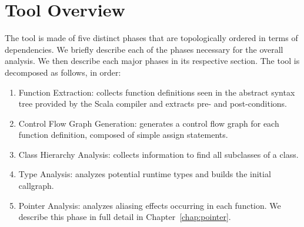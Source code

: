 \chapter{Tool Overview}
\label{chap:overview}
The tool is made of five distinct phases that are topologically ordered in terms
of dependencies. We briefly describe each of the phases necessary for the
overall analysis. We then describe each major phases in its respective section.
The tool is decomposed as follows, in order:
\begin{enumerate}
    \item{Function Extraction}: collects function definitions seen in the abstract syntax tree
    provided by the Scala compiler and extracts pre- and post-conditions.

    \item{Control Flow Graph Generation}: generates a control flow graph for each function
    definition, composed of simple assign statements.

    \item{Class Hierarchy Analysis}: collects information to find all subclasses of a class.

    \item{Type Analysis}: analyzes potential runtime types and builds the initial callgraph.

    \item{Pointer Analysis}: analyzes aliasing effects occurring in each
    function. We describe this phase in full detail in
    Chapter~\ref{chap:pointer}.
\end{enumerate}
